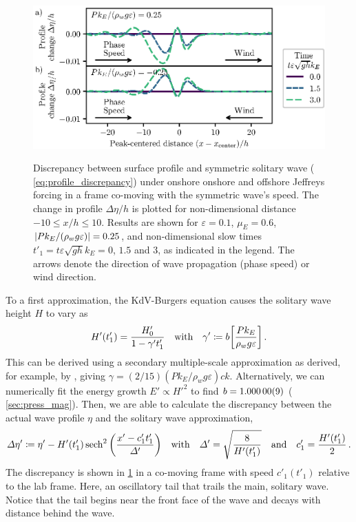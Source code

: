 \documentclass{jfm}
\renewcommand*{\epsilon}{\varepsilon}
\begin{document}
\begin{figure}
  \centering
  { %
    \label{fig:snapshots_solitary_tail:a}
    \label{fig:snapshots_solitary_tail:b}
  }
  \includegraphics{Snapshots-Positive-Negative-Tail.eps}
  \caption{
    Discrepancy between surface profile and symmetric solitary wave
    (\cf{} \cref{eq:profile_discrepancy}) under onshore
     onshore and
     offshore Jeffreys forcing in
    a frame co-moving with the symmetric wave's speed.
    The change in profile $\Delta \eta/h$ is plotted for non-dimensional
    distance $-10 \le x/h \le 10$.
    Results are shown for $\epsilon=0.1$, $\mu_E = 0.6$, $\abs{P
    k_E/(\rho_w g \epsilon)} = 0.25$, and non-dimensional slow times
    $t'_1 = t \epsilon \sqrt{gh} k_E = 0$, $1.5$ and $3$, as indicated
    in the legend.
    The arrows denote the direction of wave propagation (phase speed) or
    wind direction.
  }\label{fig:snapshots_solitary_tail}
\end{figure}

To a first approximation, the KdV-Burgers equation causes the solitary
wave height $H$ to vary as
\begin{equation}
  H'(t'_1) = \frac{H'_0}{1 - \gamma' t'_1}
  \qq{with}
  \gamma' \coloneqq b \bqty{\frac{P k_E}{\rho_w g \epsilon}}
  \,.
  \label{eq:height_approx}
\end{equation}
This can be derived using a secondary multiple-scale approximation as
derived, for example, by \citet{zdyrski2019effects}, giving $\gamma =
(2/15) (P k_E/\rho_w g \epsilon) ck$.
Alternatively, we can numerically fit the energy growth $E' \propto
H'^2$ to find $b = \num{1.00000 \pm 0.00009}$ (\cf{}
\cref{sec:press_mag}).
Then, we are able to calculate the discrepancy between the actual wave
profile $\eta$ and the solitary wave approximation,
\begin{equation}
  \Delta \eta' \coloneqq \eta'
    - H'(t'_1) \sech^2\pqty{\frac{x' - c'_1 t'_1}{\Delta'}}
  \qq{with}
  \Delta' = \sqrt{\frac{8}{H'(t'_1)}}
  \qq{and}
  c'_1 = \frac{H'(t'_1)}{2} \,.
  \label{eq:profile_discrepancy}
\end{equation}
The discrepancy is shown in \cref{fig:snapshots_solitary_tail} in a
co-moving frame with speed $c'_1(t'_1)$ relative to the lab frame.
Here, an oscillatory tail that trails the main, solitary wave.
Notice that the tail begins near the front face of the wave and decays
with distance behind the wave.
\end{document}
